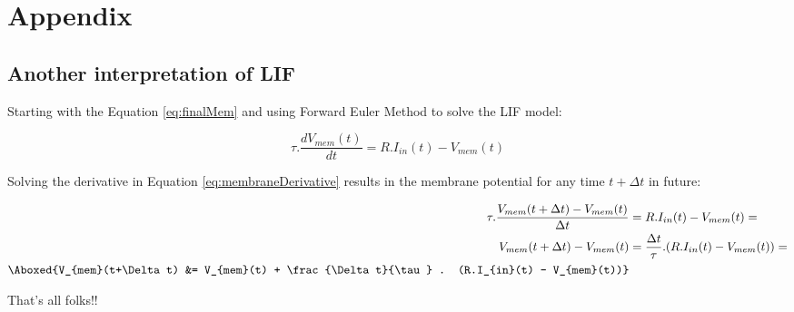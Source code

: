 \section{Appendix}

	\subsection{Another interpretation of LIF}
		
		\par Starting with the Equation \ref{eq:finalMem} and using Forward Euler Method to solve the LIF model:
		
		\begin{equation}
			\tau.\dfrac{dV_{mem}(t)}{dt} = R.I_{in}(t) - V_{mem}(t)
		\end{equation}
		
		\par Solving the derivative in Equation \ref{eq:membraneDerivative} results in the membrane potential for any time $t+\Delta t$ in future:
		
		\begin{equation}
			\label{eq:membraneDerivative}
			\begin{aligned}
				\tau.\dfrac{V_{mem}(t+\Delta t) - V_{mem}(t)}{\Delta t} &= R.I_{in}(t) - V_{mem}(t) = \\
				V_{mem}(t+\Delta t) - V_{mem}(t) &= \frac{\Delta t}{\tau} . (R.I_{in}(t) - V_{mem}(t)) = \\
				\Aboxed{V_{mem}(t+\Delta t) &= V_{mem}(t) + \frac{\Delta t}{\tau} . (R.I_{in}(t) - V_{mem}(t))}
			\end{aligned}
		\end{equation}

		\par That's all folks!!
	